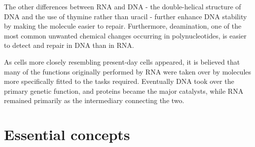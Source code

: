 The other differences between RNA and DNA - the double-helical structure
of DNA and the use of thymine rather than uracil - further enhance
DNA stability by making the molecule easier to repair.
Furthermore, deamination, one of the most common unwanted chemical changes occurring in
polynucleotides, is easier to detect and repair in DNA than in RNA.

As cells more closely resembling present-day cells appeared, it is
believed that many of the functions originally performed by RNA were
taken over by molecules more specifically fitted to the tasks required.
Eventually DNA took over the primary genetic function, and proteins
became the major catalysts, while RNA remained primarily as the intermediary
connecting the two.

\section{Essential concepts}

